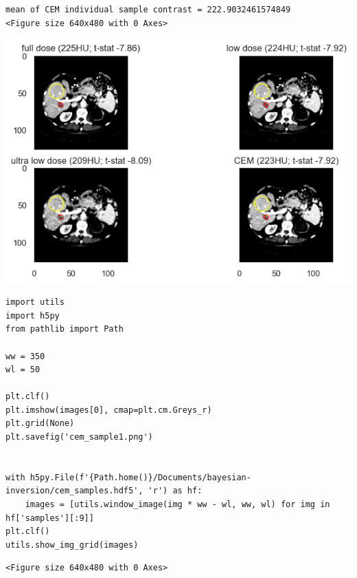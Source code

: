\documentclass[a4paper, 11pt]{article}
\begin{document}
\begin{verbatim}
mean of CEM individual sample contrast = 222.9032461574849
<Figure size 640x480 with 0 Axes>
\end{verbatim}

\begin{center}
\includegraphics[width=.9\linewidth]{./.ob-jupyter/e740404a2befda3f577afd66c37d89a71ea77324.png}
\end{center}


\begin{verbatim}
import utils
import h5py
from pathlib import Path

ww = 350
wl = 50

plt.clf()
plt.imshow(images[0], cmap=plt.cm.Greys_r)
plt.grid(None)
plt.savefig('cem_sample1.png')


with h5py.File(f'{Path.home()}/Documents/bayesian-inversion/cem_samples.hdf5', 'r') as hf:
    images = [utils.window_image(img * ww - wl, ww, wl) for img in hf['samples'][:9]]
plt.clf()
utils.show_img_grid(images)

\end{verbatim}

\begin{verbatim}
<Figure size 640x480 with 0 Axes>
\end{verbatim}
\end{document}
